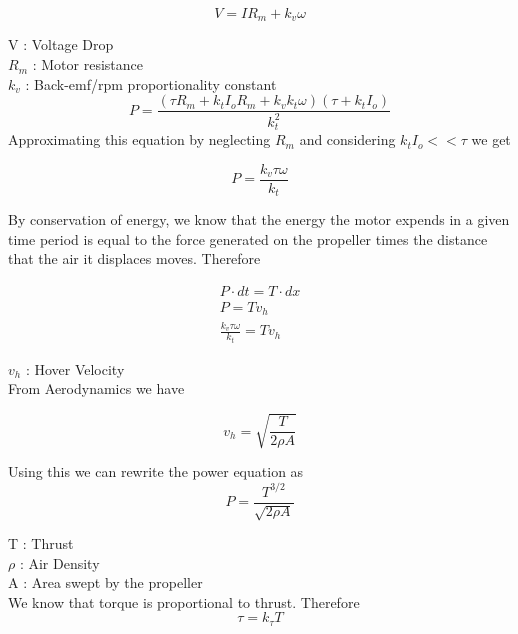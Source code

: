 \documentclass[9pt]{article}
\begin{document}
\begin{equation}
V = IR_{m} + k_{v}\omega
\end{equation}						
		
\noindent V	 : Voltage Drop\\
$R_{m}$	 : Motor resistance\\
$k_{v}$	 : Back-emf/rpm proportionality constant\\

\begin{equation}
P = \frac{(\tau R_{m}+k_{t}I_{o}R_{m}+k_{v}k_{t}\omega)(\tau + k_{t}I_{o})}{k_{t}^2}
\end{equation}						
\noindent Approximating this equation by neglecting $R_{m}$ and considering $k_{t}I_{o} << \tau$ we get
 
\begin{equation}
P = \frac{k_{v}\tau\omega}{k_{t}}
\end{equation}						

\noindent By conservation of energy, we know that the energy the motor expends in a given time period is equal to the force generated on the propeller times the distance that the air it displaces moves. Therefore

\begin{eqnarray}
P \cdot dt=T \cdot dx\\
P=Tv_{h}\\
\frac{k_{v}\tau\omega}{k_{t}}=Tv_{h}
\end{eqnarray}

\noindent $v_{h}$ : Hover Velocity\\

\noindent From Aerodynamics we have

\begin{equation}
v_{h} = \sqrt{\frac{T}{2 \rho A}}
\end{equation}				

\noindent Using this we can rewrite the power equation as
\begin{equation}
P = \frac{T^{3/2}}{\sqrt{2 \rho A}}
\end{equation}
						
\noindent T : Thrust\\
$\rho$ : Air Density \\
A : Area swept by the propeller\\

\noindent We know that torque is proportional to thrust. Therefore
\begin{equation}
\tau = k_{\tau}T
\end{equation}
\end{document}

